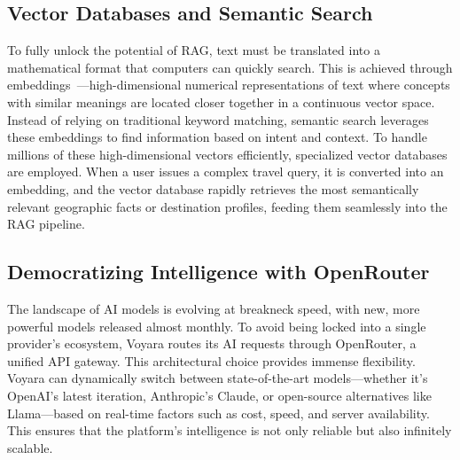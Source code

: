 \subsection{Vector Databases and Semantic Search}
To fully unlock the potential of RAG, text must be translated into a mathematical format that computers can quickly search. This is achieved through embeddings~\cite{mikolov2013word2vec}—high-dimensional numerical representations of text where concepts with similar meanings are located closer together in a continuous vector space. Instead of relying on traditional keyword matching, semantic search leverages these embeddings to find information based on intent and context. To handle millions of these high-dimensional vectors efficiently, specialized vector databases are employed. When a user issues a complex travel query, it is converted into an embedding, and the vector database rapidly retrieves the most semantically relevant geographic facts or destination profiles, feeding them seamlessly into the RAG pipeline.

\subsection{Democratizing Intelligence with OpenRouter}
The landscape of AI models is evolving at breakneck speed, with new, more powerful models released almost monthly. To avoid being locked into a single provider's ecosystem, Voyara routes its AI requests through OpenRouter, a unified API gateway. This architectural choice provides immense flexibility. Voyara can dynamically switch between state-of-the-art models—whether it's OpenAI's latest iteration, Anthropic's Claude, or open-source alternatives like Llama—based on real-time factors such as cost, speed, and server availability. This ensures that the platform's intelligence is not only reliable but also infinitely scalable.

